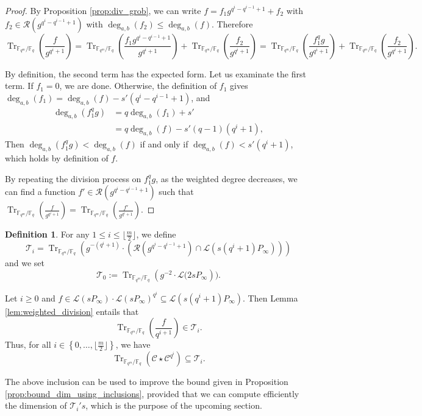 \documentclass[a4paper]{article}
\theoremstyle{definition}
\newtheorem{definition}[thm]{Definition}
\theoremstyle{remark}
\newcommand{\calL}{\mathcal{L}}
\newcommand{\calC}{\mathcal{C}}
\newcommand{\calR}{\mathcal{R}}
\newcommand{\calT}{\mathcal{T}}
\newcommand{\fq}{\mathbb{F}_{q}}
\newcommand{\Tr}[1]{\operatorname{Tr}_{\mathbb{F}_{q^m}/\fq}\left(#1\right)}
\newcommand{\set}[1]{\left\{#1\right\}}
\newcommand{\degab}[1]{\deg_{a,b}\left(#1\right)}
\begin{document}
\begin{proof}

By Proposition \ref{prop:div_grob}, we can write $f=f_1 g^{q^i-q^{i-1}+1} +f_2$ with
	$f_2 \in \calR\left(g^{q^i-q^{i-1}+1}\right)$ with $\degab{f_2} \leq \degab{f}$. Therefore
	\[\Tr{\frac{f}{g^{q^i+1}}}=\Tr{\frac{f_1 g^{q^i-q^{i-1}+1}}{g^{q^i+1}}} +\Tr{\frac{f_2}{g^{q^i+1}}}= \Tr{\frac{f_1^qg}{g^{q^i+1}}} +\Tr{\frac{f_2}{g^{q^i+1}}}. \]
	
	By definition, the second term has the expected form. Let us examinate the first term. If $f_1=0$, we are done. Otherwise, the definition of $f_1$ gives
$\degab{f_1} =\degab{f} - s'(q^i-q^{i-1}+1)$, and
	\begin{align*}
	\degab{f_1^qg} 	&= q \degab{f_1} + s'\\
					&= q\degab{f} - s'(q-1)(q^i+1) ,
	\end{align*} 
Then  $\degab{f_1^qg} < \degab{f}$ if and only if $\degab{f} < s'(q^i+1)$, which holds by definition of $f$.

By repeating the division process on $f_1^qg$, as the weighted degree decreases, we can find a function $f' \in \calR\left(g^{q^i-q^{i-1}+1}\right)$ such that $\Tr{\frac{f}{g^{q^i+1}}} = \Tr{\frac{f'}{g^{q^i+1}}} $.

\end{proof}

\begin{definition} \label{def:T_i's}
For any $1 \leq i \leq \lfloor\frac{m}{2}\rfloor$, we define
$$\calT_i= \Tr{g^{-(q^i+1)}\cdot \left( \calR\left(g^{q^i-q^{i-1}+1}\right)  \cap \calL(s(q^i+1)P_\infty)\right)}$$
and we set $$\calT_0 := \Tr{g^{-2} \cdot \calL(2sP_\infty}).$$
\end{definition}

	
\noindent Let $i \geq 0$ and $f \in \calL(sP_\infty) \cdot \calL(sP_\infty)^{q^i} \subseteq \calL(s(q^i+1)P_\infty)$. Then 
Lemma \ref{lem:weighted_division} entails that 
$$\Tr{\dfrac{f}{q^{i+1}}} \in \calT_i.$$
Thus, for all $i \in \set{0,\dots,\lfloor \frac{m}{2} \rfloor}$, we have \begin{equation} \label{eq:Tr(C*C^q^i)_dans_T_i}
\Tr{\calC \star \calC^{q^i}} \subseteq \calT_i.
\end{equation}

\noindent The above inclusion can be used to improve the bound given in Proposition \ref{prop:bound_dim_using_inclusions}, provided that we can compute efficiently the dimension of $\calT_i's$, which is the purpose of the upcoming section.
\end{document}
